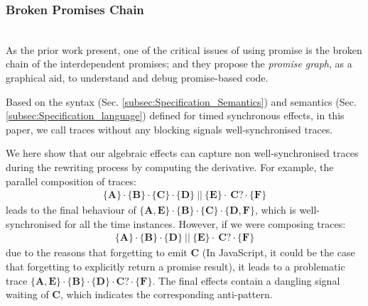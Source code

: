 \documentclass[acmsmall,review,anonymous]{acmart}\settopmatter{printfolios=true,printccs=false,printacmref=false}
\newcommand\secref[1]{Sec. \textcolor{black}{\ref{#1}}}
\begin{document}
\subsubsection{Broken Promises Chain} ~\\

      \vspace{-2mm}
As the prior work \cite{madsen2017model,alimadadi2018finding} present, one of the critical issues of using promise is the broken chain of the interdependent promises; and they propose the \emph{promise graph}, as a graphical aid, to understand and debug promise-based code. 


\begin{definition}\label{WELL}
Based on the syntax (\secref{subsec:Specification_Semantics}) and semantics (\secref{subsec:Specification_language}) defined for timed synchronous effects, in this paper, we call traces without any blocking signals well-synchronised traces. 
\end{definition}


We here show that our algebraic effects can capture non well-synchronised traces during the   
rewriting process by computing the derivative.   
 For example, the parallel composition of traces:
\begin{align*}
\{\textbf{A}\}\cdot\{\textbf{B}\}\cdot\{\textbf{C}\} \cdot\{\textbf{D}\}\  || \ \{\textbf{E}\}\cdot\ \textbf{C}? \cdot\{\textbf{F}\}
\end{align*}
 leads to the final behaviour of $\{\textbf{A},\textbf{E} \}\cdot\{\textbf{B}\}\cdot\{\textbf{C}\}\cdot\{\textbf{D}, \textbf{F}\}$, which is well-synchronised for all the time instances. However, if we were composing traces:
 \begin{align*}
\{\textbf{A}\}\cdot\{\textbf{B}\} \cdot\{\textbf{D}\}\  || \ \{\textbf{E}\}\cdot\ \textbf{C}? \cdot\{\textbf{F}\}
\end{align*}
due to the reasons that forgetting to emit {\textbf{C}} (In JavaScript, it could be the case that forgetting to explicitly return a promise result), it leads to a problematic trace  $\{\textbf{A},\textbf{E} \}\cdot\{\textbf{B}\}\cdot\{\textbf{D}\} \cdot \textbf{C}? \cdot \{\textbf{F}\}$. The final effects contain a dangling signal waiting of {\textbf{C}}, which  indicates the corresponding anti-pattern. 
\end{document}
